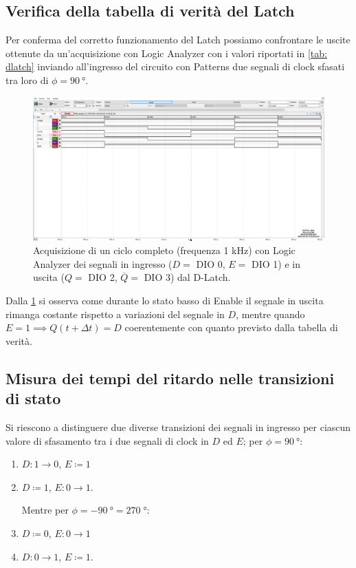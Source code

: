\documentclass[10pt, a4paper, italian]{article}
\begin{document}
\subsection{Verifica della tabella di verità del Latch}
Per conferma del corretto funzionamento del Latch possiamo confrontare
le uscite ottenute da un'acquisizione con Logic Analyzer con i valori
riportati in \cref{tab: dlatch} inviando all'ingresso del circuito con
Patterns due segnali di clock sfasati tra loro di $\phi = \SI{90}{\degree}$.
\begin{figure}[htbp]
    \centering
    \includegraphics[width=\textwidth]{dlatch}
    \caption{Acquisizione di un ciclo completo (frequenza 1 kHz) con Logic
    Analyzer dei segnali in ingresso ($D =$ DIO 0, $E =$ DIO 1) e in uscita
    ($Q =$ DIO 2, $\overline{Q} =$ DIO 3) dal D-Latch.
    \label{fig: dlatch}}
\end{figure}

Dalla \cref{fig: dlatch} si osserva come durante lo stato basso di Enable
il segnale in uscita rimanga costante rispetto a variazioni del segnale in
$D$, mentre quando $E = 1 \implies Q(t + \Delta t) = D$ coerentemente con
quanto previsto dalla tabella di verità.

\subsection{Misura dei tempi del ritardo nelle transizioni di stato}
Si riescono a distinguere due diverse transizioni dei segnali in ingresso per
ciascun valore di sfasamento tra i due segnali di clock in $D$ ed $E$;
per $\phi = \SI{90}{\degree}$:
\begin{enumerate}
\item $D: 1 \to 0$, $E \coloneqq 1$ \label{item: Dfall}
\item $D \coloneqq 1$, $E: 0 \to 1$. \label{item: Erise}

Mentre per $\phi = - \SI{90}{\degree} = 270 \; \si{\degree}$:
\item $D \coloneqq 0$, $E: 0 \to 1$ \label{item: Efall}
\item $D: 0 \to 1$, $E \coloneqq 1$. \label{item: Drise}
\end{enumerate}
\end{document}
